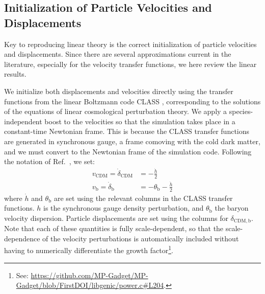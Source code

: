 \documentclass[a4paper,11pt]{article}
\newcommand{\YF}[1]{\textcolor{green}{[\bf YF: #1]} }
\begin{document}

\subsection{Initialization of Particle Velocities and Displacements}
\label{sec:particles}

Key to reproducing linear theory is the correct initialization of particle velocities and displacements. Since there are several approximations current in the literature, especially for the velocity transfer functions, we here review the linear results.

We initialize both displacements and velocities directly using the transfer functions from the linear Boltzmann code CLASS \cite{CLASS}, corresponding to the solutions of the equations of linear cosmological perturbation theory. We apply a species-independent boost to the velocities so that the simulation takes place in a constant-time Newtonian frame. This is because the CLASS transfer functions are generated in synchronous gauge, a frame comoving with the cold dark matter, and we must convert to the Newtonian frame of the simulation code. Following the notation of Ref.~\cite{Ma:1995}, we set:
\begin{align}
 v_\mathrm{CDM} = \dot{\delta}_\mathrm{CDM}  &= - \frac{\dot{h}}{2} \\
 v_\mathrm{b} = \dot{\delta}_\mathrm{b}  &= - \theta_\mathrm{b} - \frac{\dot{h}}{2}
\end{align}
where $\dot{h}$ and $\theta_\mathrm{b}$ are set using the relevant columns in the CLASS transfer functions. $h$ is the synchronous gauge density perturbation, and $\theta_\mathrm{b}$ the baryon velocity dispersion.
Particle displacements are set using the columns for $\delta_\mathrm{CDM, b}$. Note that each of these quantities is fully scale-dependent, so that the scale-dependence of the velocity perturbations is automatically included without having to numerically differentiate the growth factor\footnote{See: \protect\url{https://github.com/MP-Gadget/MP-Gadget/blob/FirstDOI/libgenic/power.c\#L204}.}.
\end{document}
